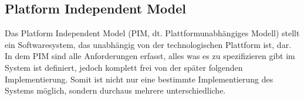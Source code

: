 \subsection{Platform Independent Model} \label{PIM}
Das Platform Independent Model (PIM, dt. Plattformunabhängiges Modell) stellt
ein Softwaresystem, das unabhängig von der technologischen Plattform ist, dar.
In dem PIM sind alle Anforderungen erfasst, alles was es zu spezifizieren gibt im System ist definiert,
jedoch komplett frei von der später folgenden Implementierung. Somit ist nicht
nur eine bestimmte Implementierung des Systems möglich, sondern durchaus mehrere
unterschiedliche.